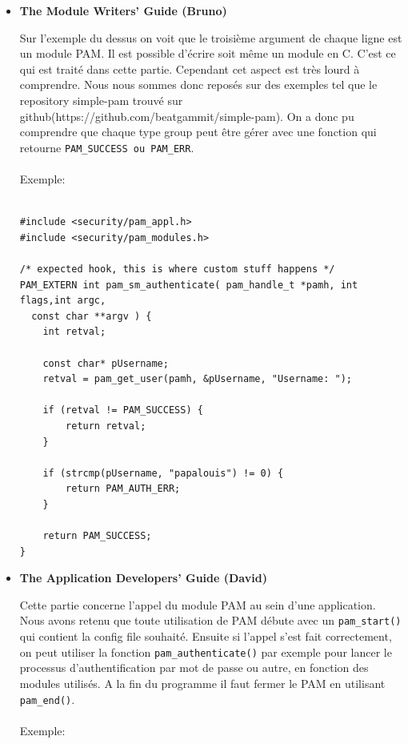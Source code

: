 \documentclass[french]{report}
\begin{document}
\begin{itemize}[label=\textbullet, font=\normalfont \color{blue}]
\vspace{0.5cm}

    \item{\textbf{The Module Writers' Guide (Bruno)}}

    \vspace{0.05cm}

Sur l’exemple du dessus on voit que le troisième argument de chaque ligne est
un module PAM. Il est possible d’écrire soit même un module en C. C’est ce qui
est traité dans cette partie. Cependant cet aspect est très lourd à comprendre.
Nous nous sommes donc reposés sur des exemples tel que le repository simple-pam
trouvé sur github(https://github.com/beatgammit/simple-pam). On a donc pu comprendre que chaque type group peut être
gérer avec une fonction qui retourne \texttt{PAM\_SUCCESS ou PAM\_ERR}.
\\ \\
    Exemple:

  \begin{verbatim}

#include <security/pam_appl.h>
#include <security/pam_modules.h>

/* expected hook, this is where custom stuff happens */
PAM_EXTERN int pam_sm_authenticate( pam_handle_t *pamh, int flags,int argc,
  const char **argv ) {
	int retval;

	const char* pUsername;
	retval = pam_get_user(pamh, &pUsername, "Username: ");

	if (retval != PAM_SUCCESS) {
		return retval;
	}

	if (strcmp(pUsername, "papalouis") != 0) {
		return PAM_AUTH_ERR;
	}

	return PAM_SUCCESS;
}
\end{verbatim}

\vspace{0.5cm}

    \item{\textbf{The Application Developers' Guide (David)}}

    \vspace{0.05cm}

  Cette partie concerne l’appel du module PAM au sein d’une application. Nous
  avons retenu que toute utilisation de PAM débute avec un \texttt{pam\_start()}
  qui contient la config file souhaité. Ensuite si l’appel s’est fait
  correctement, on peut utiliser la fonction \texttt{pam\_authenticate()} par
  exemple pour lancer le processus d’authentification par mot de passe ou
  autre, en fonction des modules utilisés. A la fin du programme il faut fermer
  le PAM en utilisant \texttt{pam\_end()}.
\\ \\
\newpage
    Exemple:


\end{itemize}
\end{document}
